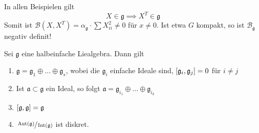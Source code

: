 In allen Beispielen gilt
\[
	X \in \mathfrak{g} \implies X^T \in \mathfrak{g}
\]
Somit ist $\mathcal{B}(X,X^T) = \alpha_\mathfrak{g} \cdot \sum X_{ii}^2 \neq 0$ für $x\neq 0$.
Ist etwa $G$ kompakt, so ist $\mathcal{B}_\mathfrak{g}$ negativ definit!

\begin{satz}[label=satz:222]
	Sei $\mathfrak{g}$ eine halbeinfache Liealgebra.
	Dann gilt
	\begin{enumerate}[1)]
		\item $\mathfrak{g} = \mathfrak{g}_1 \oplus  \ldots \oplus \mathfrak{g}_s$, wobei die $\mathfrak{g}_i$ einfache Ideale sind, $\benbrace*{\mathfrak{g}_i,\mathfrak{g}_j}=0$ für $i \neq j$
		\item Ist $\mathfrak{a} \subset \mathfrak{g}$ ein Ideal, so folgt $\mathfrak{a} = \mathfrak{g}_{i_1} \oplus  \ldots \oplus \mathfrak{g}_{i_k}$
		\item $\benbrace*{\mathfrak{g},\mathfrak{g}}=\mathfrak{g}$
		\item $\sfrac{\Aut(\mathfrak{g})}{\Int(\mathfrak{g})}$ ist diskret.
	\end{enumerate}
\end{satz}

